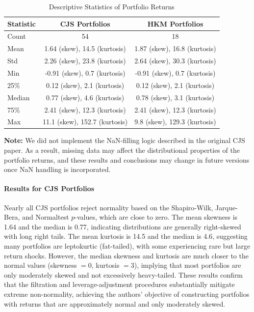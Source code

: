 \documentclass{article}
\begin{document}
\begin{appendices}
\begin{table}[H]
  \centering
  \caption{Descriptive Statistics of Portfolio Returns}
  \label{tab:portfolio_stats}
  \begin{tabular}{lcc}
    \toprule
    \textbf{Statistic} & \textbf{CJS Portfolios} & \textbf{HKM Portfolios} \\
    \midrule
    Count   & 54                          & 18                          \\
    Mean    & 1.64 (skew), 14.5 (kurtosis)  & 1.87 (skew), 16.8 (kurtosis) \\
    Std     & 2.26 (skew), 23.8 (kurtosis)  & 2.64 (skew), 30.3 (kurtosis) \\
    Min     & -0.91 (skew), 0.7 (kurtosis)  & -0.91 (skew), 0.7 (kurtosis) \\
    25\%    & 0.12 (skew), 2.1 (kurtosis)   & 0.12 (skew), 2.1 (kurtosis) \\
    \rowcolor{blue!20}
    Median  & 0.77 (skew), 4.6 (kurtosis)   & 0.78 (skew), 3.1 (kurtosis) \\
    75\%    & 2.41 (skew), 12.3 (kurtosis)  & 2.41 (skew), 12.3 (kurtosis) \\
    Max     & 11.1 (skew), 152.7 (kurtosis) & 9.8 (skew), 129.3 (kurtosis) \\
    \bottomrule
  \end{tabular}
\end{table}

\textbf{Note:} We did not implement the NaN-filling logic described in the original CJS paper. As a result, missing data may affect the distributional properties of the portfolio returns, and these results and conclusions may change in future versions once NaN handling is incorporated.

\paragraph{Results for CJS Portfolios}

Nearly all CJS portfolios reject normality based on the Shapiro-Wilk, Jarque-Bera, and Normaltest $p$-values, which are close to zero. The mean skewness is 1.64 and the median is 0.77, indicating distributions are generally right-skewed with long right tails. The mean kurtosis is 14.5 and the median is 4.6, suggesting many portfolios are leptokurtic (fat-tailed), with some experiencing rare but large return shocks. However, the median skewness and kurtosis are much closer to the normal values (skewness $=0$, kurtosis $=3$), implying that most portfolios are only moderately skewed and not excessively heavy-tailed. These results confirm that the filtration and leverage-adjustment procedures substantially mitigate extreme non-normality, achieving the authors' objective of constructing portfolios with returns that are approximately normal and only moderately skewed.


\end{appendices}
\end{document}
